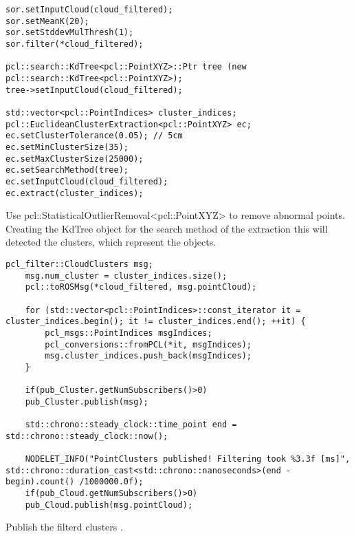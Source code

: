 \begin{lstlisting}[caption={}]
sor.setInputCloud(cloud_filtered);
sor.setMeanK(20);
sor.setStddevMulThresh(1);
sor.filter(*cloud_filtered);

pcl::search::KdTree<pcl::PointXYZ>::Ptr tree (new pcl::search::KdTree<pcl::PointXYZ>);
tree->setInputCloud(cloud_filtered);

std::vector<pcl::PointIndices> cluster_indices;
pcl::EuclideanClusterExtraction<pcl::PointXYZ> ec;
ec.setClusterTolerance(0.05); // 5cm
ec.setMinClusterSize(35);
ec.setMaxClusterSize(25000);
ec.setSearchMethod(tree);
ec.setInputCloud(cloud_filtered);
ec.extract(cluster_indices);
\end{lstlisting}


Use pcl::StatisticalOutlierRemoval<pcl::PointXYZ> to remove abnormal points.\\
Creating the KdTree object for the search method of the extraction this will detected the clusters, which represent the objects.
\begin{lstlisting}[caption={}]
	pcl_filter::CloudClusters msg;
	msg.num_cluster = cluster_indices.size();
	pcl::toROSMsg(*cloud_filtered, msg.pointCloud);
	
	for (std::vector<pcl::PointIndices>::const_iterator it = cluster_indices.begin(); it != cluster_indices.end(); ++it) {
		pcl_msgs::PointIndices msgIndices;
		pcl_conversions::fromPCL(*it, msgIndices);
		msg.cluster_indices.push_back(msgIndices);
	}
	
	if(pub_Cluster.getNumSubscribers()>0)
	pub_Cluster.publish(msg);
	
	std::chrono::steady_clock::time_point end = std::chrono::steady_clock::now();
	
	NODELET_INFO("PointClusters published! Filtering took %3.3f [ms]", std::chrono::duration_cast<std::chrono::nanoseconds>(end - begin).count() /1000000.0f);
	if(pub_Cloud.getNumSubscribers()>0)
	pub_Cloud.publish(msg.pointCloud);
\end{lstlisting}
Publish the filterd clusters .\\